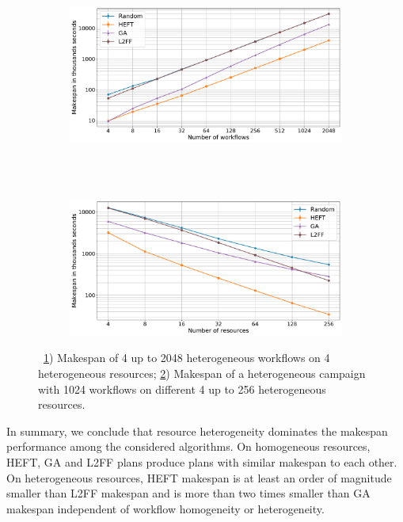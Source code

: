 \begin{figure}[t]
    \centering
    \begin{subfigure}[b]{0.75\textwidth}
        \includegraphics[width=.95\textwidth]{figures/campaign/StHeteroCampaigns_4StHeteroResources.pdf}
        \caption{}
        \label{fig:StHeteroCampaigns_4StHeteroResources}
    \end{subfigure}\\
    ~
    \begin{subfigure}[b]{0.75\textwidth}
        \includegraphics[width=.95\textwidth]{figures/campaign/StHeteroResources_StHeteroCampaigns.pdf}
        \caption{}
        \label{fig:StHeteroResources_StHeteroCampaigns}
    \end{subfigure}
    \caption{~\ref{fig:StHeteroCampaigns_4StHeteroResources}) Makespan of 4 up
        to 2048 heterogeneous workflows on 4 heterogeneous resources;
        \ref{fig:StHeteroResources_StHeteroCampaigns}) Makespan of a
        heterogeneous campaign with 1024 workflows on different 4 up to 256
        heterogeneous resources.}
    \label{fig:heter_analysis}
\end{figure}

In summary, we conclude that resource heterogeneity dominates the makespan
performance among the considered algorithms. On homogeneous resources, HEFT,
GA and L2FF plans produce plans with similar makespan to each other. On
heterogeneous resources, HEFT makespan is at least an order of magnitude
smaller than L2FF makespan and is more than two times smaller than GA makespan
independent of workflow homogeneity or heterogeneity.

